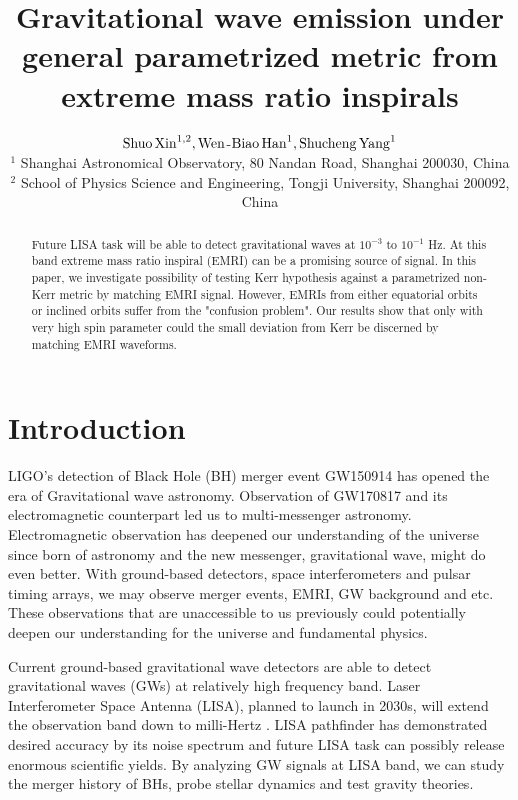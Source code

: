 \documentclass{article}
\begin{document}
\title{Gravitational wave emission under general parametrized metric from extreme mass ratio inspirals}
\author{${\rm Shuo\, Xin}^{1,2}, {\rm Wen}$-${\rm Biao\, Han}^1, {\rm Shucheng\, Yang}^1$\\
$^1$ Shanghai Astronomical Observatory, 80 Nandan Road, Shanghai 200030, China\\
$^2$ School of Physics Science and Engineering, Tongji University, Shanghai 200092, China}
\date{}
\maketitle
\begin{abstract}
	Future LISA task will be able to detect gravitational waves at $10^{-3}$ to $10^{-1}$ Hz. At this band extreme mass ratio inspiral (EMRI) can be a promising source of signal. In this paper, we investigate possibility of testing Kerr hypothesis against a parametrized non-Kerr metric by matching EMRI signal. However, EMRIs from either equatorial orbits or inclined orbits suffer from the "confusion problem". Our results show that only with very high spin parameter could the small deviation from Kerr be discerned by matching EMRI waveforms.
\end{abstract}


\section{Introduction}

LIGO's detection of Black Hole (BH) merger event GW150914 has opened the era of Gravitational wave astronomy\cite{ligo}. Observation of  GW170817 \cite{170817}and its electromagnetic counterpart led us to multi-messenger astronomy\cite{multi}. Electromagnetic observation has deepened our understanding of the universe since born of astronomy and the new messenger, gravitational wave, might do even better. With ground-based detectors\cite{a_ligo}\cite{virgo}, space interferometers\cite{lisa_org} and pulsar timing arrays\cite{PTA}, we may observe merger events, EMRI, GW background and etc. These observations that are unaccessible to us previously could potentially deepen our understanding for the universe and fundamental physics.

Current ground-based gravitational wave detectors are able to detect gravitational waves (GWs) at relatively high frequency band. Laser Interferometer Space Antenna (LISA), planned to launch in 2030s, will extend the observation band down to milli-Hertz \cite{lisa}. LISA pathfinder has demonstrated desired accuracy by its noise spectrum\cite{LPF} and future LISA task can possibly release enormous scientific yields. By analyzing GW signals at LISA band, we can study the merger history of BHs\cite{lisa_mergerhistory}, probe stellar dynamics\cite{sameOmg} and test gravity theories\cite{test_GR}.
\end{document}
